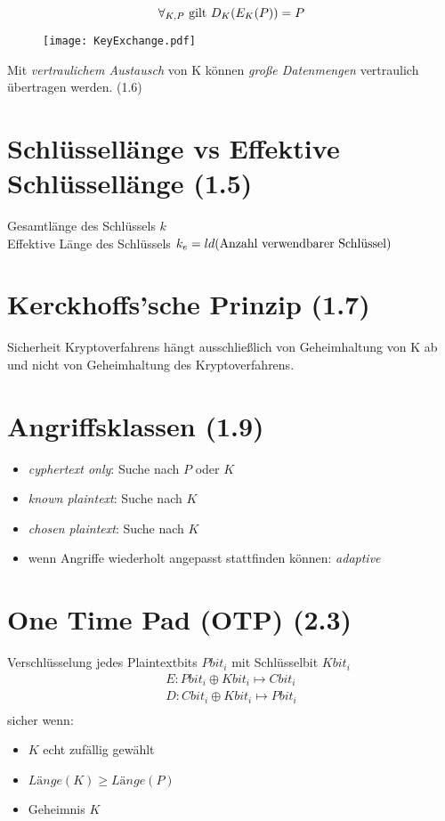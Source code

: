 $$\forall_{K, P} \textnormal{ gilt } D_K(E_K(P)) = P$$

\begin{figure}[htp]
	\centering
	\texttt{[image: KeyExchange.pdf]}
	\label{KeyEx}
\end{figure}
Mit \emph{vertraulichem Austausch} von K können \emph{große Datenmengen} vertraulich übertragen werden. (1.6)

\section{Schlüssellänge vs Effektive Schlüssellänge (1.5)}
Gesamtlänge des Schlüssels $k$ \\
Effektive Länge des Schlüssels $k_e = ld(\textnormal{Anzahl verwendbarer Schlüssel})$

\section{Kerckhoffs'sche Prinzip (1.7)}
Sicherheit Kryptoverfahrens hängt ausschließlich von Geheimhaltung von K ab und nicht von Geheimhaltung des Kryptoverfahrens.

\section{Angriffsklassen (1.9)}
\begin{itemize}
  \item \emph{cyphertext only}: Suche nach $P$ oder $K$
  \item \emph{known plaintext}: Suche nach $K$
  \item \emph{chosen plaintext}: Suche nach $K$
  \item wenn Angriffe wiederholt angepasst stattfinden können: \emph{adaptive}
\end{itemize}

\section{One Time Pad (OTP) (2.3)}
Verschlüsselung jedes Plaintextbits $Pbit_i$ mit Schlüsselbit $Kbit_i$
\begin{align*}
E: Pbit_i \oplus Kbit_i \mapsto Cbit_i \\
D: Cbit_i \oplus Kbit_i \mapsto Pbit_i \\
\end{align*}
sicher wenn:
\begin{itemize}
  \item $K$ echt zufällig gewählt
  \item $Länge(K) \geq Länge(P)$
  \item Geheimnis $K$ 
\end{itemize}



